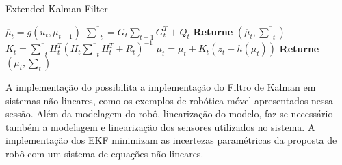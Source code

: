 \begin{algorithm}[H]
    \caption{Extended-Kalman-Filter}
    \begin{algorithmic}[1]
        \State $\overline{\mu}_t = g(u_t, \mu_{t-1})$
        \State $ \overline{\textstyle\sum}_t = G_t {\textstyle\sum}_{t-1} G_t^T+ Q_t$ 
        \State \textbf{Returne} $\left(\overline{\mu}_t, \overline{\textstyle\sum}_t\right)$
    \EndProcedure
        \State $K_t = \overline{\textstyle\sum}_tH_t^T(H_t\overline{\textstyle\sum}_tH_t^T+R_t)^{-1}$
        \State $\mu_t  = \overline{\mu}_t + K_t(z_t -h(\overline\mu_t))$
        \State \textbf{Returne} $\left(\mu_t, \textstyle\sum_t\right)$
    \EndProcedure
    \end{algorithmic}
    \label{algo:ekf}
\end{algorithm}

A implementação do  possibilita a implementação do Filtro de Kalman em sistemas não lineares, como os exemplos de robótica móvel apresentados nessa sessão. Além da modelagem do robô, linearização do modelo, faz-se necessário também a modelagem e linearização dos sensores utilizados no sistema. A implementação dos EKF minimizam as incertezas paramétricas da proposta de robô com um sistema de equações não lineares.

